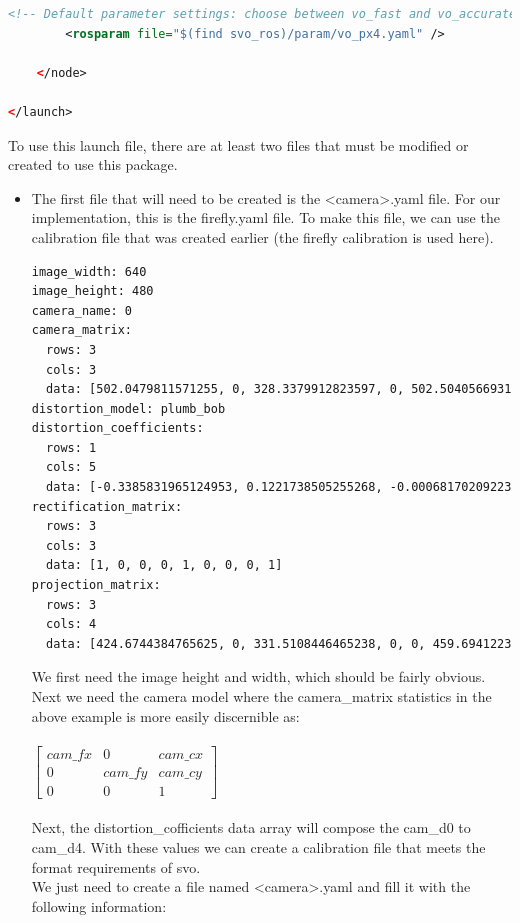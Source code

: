 \begin{itemize}
\begin{lstlisting}[language=xml]
        <!-- Default parameter settings: choose between vo_fast and vo_accurate -->
        <rosparam file="$(find svo_ros)/param/vo_px4.yaml" />

    </node>
        
</launch>	
\end{lstlisting}
To use this launch file, there are at least two files that must be modified or created to use this package.\\
\begin{itemize}
\item The first file that will need to be created is the <camera>.yaml file. For our implementation, this is the firefly.yaml file. To make this file, we can use the calibration file that was created earlier (the firefly calibration is used here). 
\begin{lstlisting}[language=xml]
image_width: 640
image_height: 480
camera_name: 0
camera_matrix:
  rows: 3
  cols: 3
  data: [502.0479811571255, 0, 328.3379912823597, 0, 502.5040566931246, 249.276443286676, 0, 0, 1]
distortion_model: plumb_bob
distortion_coefficients:
  rows: 1
  cols: 5
  data: [-0.3385831965124953, 0.1221738505255268, -0.000681702092234282, 0.0005802657058398539, 0]
rectification_matrix:
  rows: 3
  cols: 3
  data: [1, 0, 0, 0, 1, 0, 0, 0, 1]
projection_matrix:
  rows: 3
  cols: 4
  data: [424.6744384765625, 0, 331.5108446465238, 0, 0, 459.6941223144531, 250.1992172933205, 0, 0, 0, 1, 0]
\end{lstlisting}
We first need the image height and width, which should be fairly obvious. Next we need the camera model where the camera\_matrix statistics in the above example is more easily discernible as:
\\
\vspace{2mm}\\
$
\begin{bmatrix}
    cam\_fx  &  	0 	 & cam\_cx \\
    0	    & cam\_fy & cam\_cy \\
    0	    & 0 & 1
\end{bmatrix}
$\\
\vspace{2mm}\\
Next, the distortion\_cofficients data array will compose the cam\_d0 to cam\_d4. With these values we can create a calibration file that meets the format requirements of svo.\\
We just need to create a file named <camera>.yaml and fill it with the following information:
\begin{lstlisting}[language=python]

\end{lstlisting}
\end{itemize}
\end{itemize}
